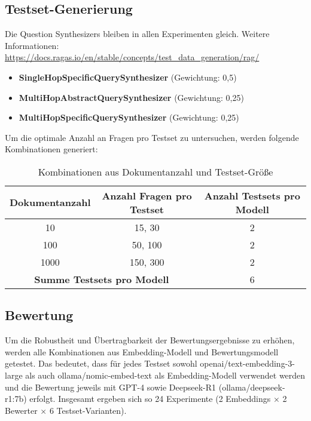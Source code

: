 \subsection{Testset-Generierung}
Die Question Synthesizers bleiben in allen Experimenten gleich.  
Weitere Informationen: \url{https://docs.ragas.io/en/stable/concepts/test_data_generation/rag/}

\begin{itemize}
    \item \textbf{SingleHopSpecificQuerySynthesizer} (Gewichtung: 0{,}5)
    \item \textbf{MultiHopAbstractQuerySynthesizer} (Gewichtung: 0{,}25)
    \item \textbf{MultiHopSpecificQuerySynthesizer} (Gewichtung: 0{,}25)
\end{itemize}

Um die optimale Anzahl an Fragen pro Testset zu untersuchen, werden folgende Kombinationen generiert:

\begin{table}[htbp]
    \centering
    \begin{tabular}{|c|c|c|}
        \hline
        \textbf{Dokumentanzahl} & \textbf{Anzahl Fragen pro Testset} & \textbf{Anzahl Testsets pro Modell} \\
        \hline
        10   & 15, 30    & 2 \\
        100  & 50, 100   & 2 \\
        1000 & 150, 300  & 2 \\
        \hline
        \multicolumn{2}{|c|}{\textbf{Summe Testsets pro Modell}} & 6 \\
        \hline
    \end{tabular}
    \caption{Kombinationen aus Dokumentanzahl und Testset-Größe}
\end{table}

\subsection{Bewertung}
Um die Robustheit und Übertragbarkeit der Bewertungsergebnisse zu erhöhen, werden alle Kombinationen aus Embedding-Modell und Bewertungsmodell getestet. Das bedeutet, dass für jedes Testset sowohl openai/text-embedding-3-large als auch ollama/nomic-embed-text als Embedding-Modell verwendet werden und die Bewertung jeweils mit GPT-4 sowie Deepseek-R1 (ollama/deepseek-r1:7b) erfolgt. Insgesamt ergeben sich so 24 Experimente (2 Embeddings × 2 Bewerter × 6 Testset-Varianten).

